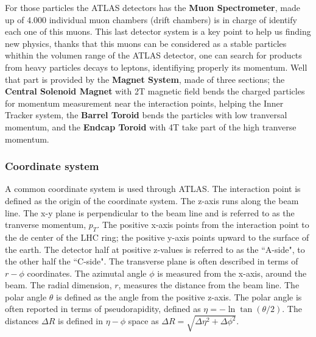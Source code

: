 \par

For those particles the ATLAS detectors has the {\bf Muon Spectrometer}, made up of 4.000 individual muon chambers
(drift
chambers) is in charge of identify each one of this muons. This last detector system is a key point to help us finding
new physics, thanks that this muons can be considered as a stable particles whithin the volumen range of the ATLAS
detector, one can search for products from heavy particles decays to leptons, identifiying properly  its momentum. Well
that part is provided by the {\bf Magnet System}, made of three sections; the {\bf Central Solenoid Magnet} with 2T
magnetic field bends the
charged particles for momentum measurement near the interaction points, helping the Inner Tracker system, the {\bf
Barrel Toroid} bends the particles with low tranversal momentum, and the {\bf Endcap Toroid} with 4T take part of the
high tranverse momentum.\par

\subsubsection{Coordinate system}
A common coordinate system is used through ATLAS. The interaction point is defined as the origin of the coordinate
system. The z-axis runs along the beam line. The x-y plane is perpendicular to the beam line and is referred to as the
tranverse momentum, $p_T$. The positive x-axis points from the interaction point to the de center of the LHC ring; the
positive y-axis points upward to the surface of the earth. The detector half at positive z-values is referred to as the
``A-side", to the other half the ``C-side". The transverse plane is often described in terms of $r-\phi$ coordinates. The
azimutal angle $\phi$ is measured from the x-axis, around the beam. The radial dimension, $r$, measures the distance
from the beam line. The polar angle $\theta$ is defined as the angle from the positive z-axis. The polar angle is often
reported in terms of pseudorapidity, defined as $\eta = -\ln \tan (\theta/2)$. The distances $\Delta R$ is defined in
$\eta-\phi$ space as $\Delta R = \sqrt{\Delta \eta^2 + \Delta \phi^2}$.\par





